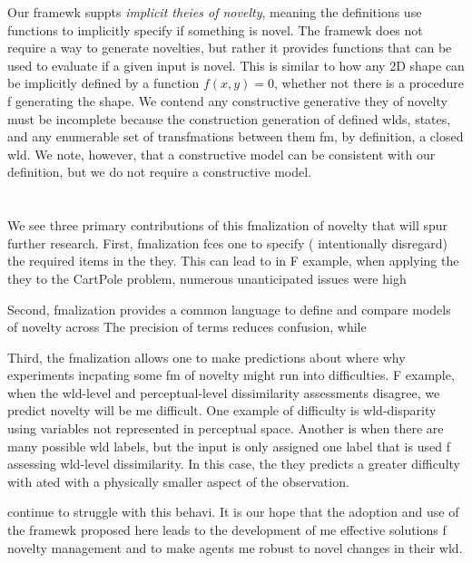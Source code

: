 \documentclass[letterpaper]{article} %
\begin{document}
Our framewk suppts \textit{implicit theies of novelty}, meaning the definitions use functions to implicitly specify if something is novel. The framewk does not require a way to generate novelties, but rather it provides functions that can be used to evaluate if a given input is novel. This is similar to how any 2D shape can be implicitly defined by a function $f(x,y)=0$, whether  not there is a procedure f generating the shape.
We contend any constructive  generative they of novelty~\cite{langley2020open} must be incomplete because the construction  generation of defined wlds, states, and any enumerable set of transfmations between them fm, by definition, a closed wld. We note, however, that a constructive model can be consistent with our definition, but we do not require a constructive model.







\section{ }


We see three primary contributions of this fmalization of novelty that will spur further research.
First, fmalization fces one to specify ( intentionally disregard) the required items in the they.
This can lead to in
F example, when applying the they to the CartPole problem, numerous unanticipated issues were high 


Second, fmalization provides a common language to define and compare models of novelty across 
The precision of terms reduces confusion, while  


Third, the fmalization allows one to make predictions about where  why experiments incpating some fm of novelty might run into difficulties.
F example, when the wld-level and perceptual-level dissimilarity assessments disagree, we predict novelty will be me difficult.
One example of difficulty is wld-disparity using variables not represented in perceptual space.
Another is when there are many possible wld labels, but the input is only assigned one label that is used f assessing wld-level dissimilarity.
In this case, the they predicts a greater difficulty with ated with a physically smaller aspect of the observation.


  continue to struggle with this behavi.
It is our hope that the adoption and use of the framewk proposed here leads to the development of me effective solutions f novelty management and to make agents me robust to novel changes in their wld.
\end{document}
